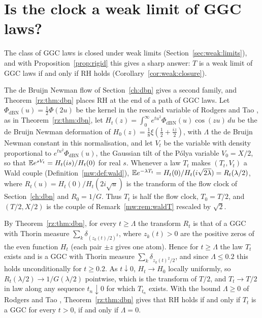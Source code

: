 
\section{Is the clock a weak limit of GGC laws?}\label{mw:sec:weak}

The class of GGC laws is closed under weak limits \cite[Theorem 3.1.5]{Bondesson} (Section~\ref{sec:weak:limits}), and with Proposition~\ref{prop:rigid} this gives a sharp answer: $T$ is a weak limit of GGC laws if and only if RH holds (Corollary~\ref{cor:weak:closure}).

The de Bruijn Newman flow of Section~\ref{ch:dbn} gives a second family, and Theorem~\ref{rz:thm:dbn} places RH at the end of a path of GGC laws. Let $\Phi_{\mathrm{dBN}}(u)=\frac12\Phi(2u)$ be the kernel in the rescaled variable of Rodgers and Tao \cite{RodgersTao}, as in Theorem~\ref{rz:thm:dbn}, let $H_t(z)=\int_0^\infty e^{tu^2}\Phi_{\mathrm{dBN}}(u)\cos(zu)\,du$ be the de Bruijn Newman deformation of $H_0(z)=\frac18\xi(\frac12+\frac{iz}2)$, with $\Lambda$ the de Bruijn Newman constant in this normalisation, and let $V_t$ be the variable with density proportional to $e^{tu^2}\Phi_{\mathrm{dBN}}(u)$, the Gaussian tilt of the P\'olya variable $V_0=X/2$, so that $\mathbb{E} e^{sV_t}=H_t(is)/H_t(0)$ for real $s$. Whenever a law $T_t$ makes $(T_t,V_t)$ a Wald couple (Definition~\ref{mw:def:wald}), $\mathbb{E} e^{-\lambda T_t}=H_t(0)/H_t(i\sqrt{2\lambda})=R_t(\lambda/2)$, where $R_t(u)=H_t(0)/H_t(2i\sqrt u)$ is the transform of the flow clock of Section~\ref{ch:dbn} and $R_0=1/G$. Thus $T_t$ is half the flow clock, $T_0=T/2$, and $(T/2,X/2)$ is the couple of Remark~\ref{mw:rem:waldT} rescaled by $\sqrt2$.

By Theorem~\ref{rz:thm:dbn}, for every $t\ge\Lambda$ the transform $R_t$ is that of a GGC with Thorin measure $\sum_k\delta_{(z_k(t)/2)^2}$, where $z_k(t)>0$ are the positive zeros of the even function $H_t$ (each pair $\pm z$ gives one atom). Hence for $t\ge\Lambda$ the law $T_t$ exists and is a GGC with Thorin measure $\sum_k\delta_{z_k(t)^2/2}$, and since $\Lambda\le0.2$ \cite{PT21,Polymath} this holds unconditionally for $t\ge0.2$. As $t\downarrow0$, $H_t\to H_0$ locally uniformly, so $R_t(\lambda/2)\to1/G(\lambda/2)$ pointwise, which is the transform of $T/2$, and $T_t\to T/2$ in law along any sequence $t_n\downarrow0$ for which $T_{t_n}$ exists. With the bound $\Lambda\ge0$ of Rodgers and Tao \cite{RodgersTao}, Theorem~\ref{rz:thm:dbn} gives that RH holds if and only if $T_t$ is a GGC for every $t>0$, if and only if $\Lambda=0$.

